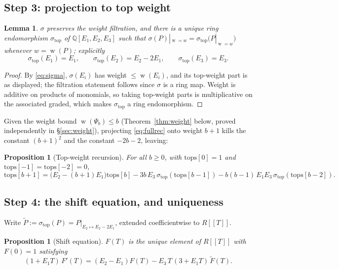\documentclass[10pt]{article}
\theoremstyle{plain}
\newtheorem{proposition}[theorem]{Proposition}
\newtheorem{lemma}[theorem]{Lemma}
\theoremstyle{definition}
\newcommand{\bbQ}{\mathbb{Q}}
\newcommand{\wt}{\operatorname{w}}
\newcommand{\sigtop}{\sigma_{\mathrm{top}}}
\begin{document}
\subsection{Step 3: projection to top weight}

\begin{lemma}\label{lem:sigmatop}
$\sigma$ preserves the weight filtration, and there is a unique ring endomorphism $\sigtop$ of
$\bbQ[E_1,E_2,E_3]$ such that $\sigma(P)|_{\wt=w}=\sigtop\big(P|_{\wt=w}\big)$ whenever
$w=\wt(P)$; explicitly
\[
 \sigtop(E_1)=E_1,\qquad \sigtop(E_2)=E_2-2E_1,\qquad \sigtop(E_3)=E_3 .
\]
\end{lemma}

\begin{proof}
By \eqref{eq:sigma}, $\sigma(E_i)$ has weight $\le\wt(E_i)$, and its top-weight part is as
displayed; the filtration statement follows since $\sigma$ is a ring map. Weight is additive
on products of monomials, so taking top-weight parts is multiplicative on the associated
graded, which makes $\sigtop$ a ring endomorphism.
\end{proof}

Given the weight bound $\wt(\Psi_b)\le b$ (Theorem~\ref{thm:weight} below, proved
independently in \S\ref{sec:weight}), projecting \eqref{eq:fullrec} onto weight $b+1$
kills the constant $(b+1)^2$ and the constant $-2b-2$, leaving:

\begin{proposition}[Top-weight recursion]\label{prop:toprec}
For all $b\ge0$, with $\mathrm{tops}[0]=1$ and $\mathrm{tops}[-1]=\mathrm{tops}[-2]=0$,
\[
 \mathrm{tops}[b+1]=\big(E_2-(b+1)E_1\big)\mathrm{tops}[b]
  -3b\,E_3\,\sigtop(\mathrm{tops}[b-1])
  -b(b-1)\,E_1E_3\,\sigtop(\mathrm{tops}[b-2]).
\]
\end{proposition}

\subsection{Step 4: the shift equation, and uniqueness}

Write $\widetilde{P}:=\sigtop(P)=P|_{E_2\mapsto E_2-2E_1}$, extended coefficientwise to
$R[[T]]$.

\begin{proposition}[Shift equation]\label{prop:shiftode}
$F(T)$ is the unique element of $R[[T]]$ with $F(0)=1$ satisfying
\begin{equation}\label{eq:shift}
 (1+E_1T)\,F'(T)=(E_2-E_1)F(T)-E_3\,T\,(3+E_1T)\,\widetilde F(T).
\end{equation}
\end{proposition}
\end{document}
